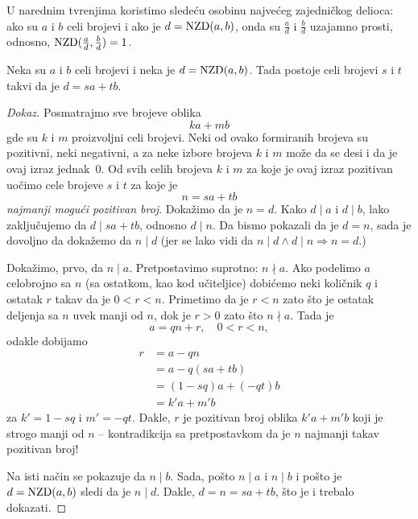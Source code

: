 U narednim tvr\dj enjima koristimo slede\'cu osobinu najve\'ceg zajedni\v ckog delioca:
ako su $a$ i $b$ celi brojevi i ako je $d = \mathrm{NZD}(a, b)$, onda su $\frac ad$ i $\frac bd$
uzajamno prosti, odnosno, $\mathrm{NZD}(\frac ad, \frac bd) = 1$.

\begin{EX}\label{ft05.ex.NZD-lin-komb}
  Neka su $a$ i $b$ celi brojevi i neka je $d = \mathrm{NZD}(a, b)$. Tada postoje celi brojevi $s$ i $t$ takvi da je
  $d = s a + t b$.
\end{EX}
\begin{proof}[Dokaz]
  Posmatrajmo sve brojeve oblika
  $$
    k a + m b
  $$
  gde su $k$ i $m$ proizvoljni celi brojevi. Neki od ovako formiranih brojeva su pozitivni, neki negativni, a za neke
  izbore brojeva $k$ i $m$ mo\v ze da se desi i da je ovaj izraz jednak~0. Od svih celih brojeva $k$ i $m$ za koje
  je ovaj izraz pozitivan uo\v cimo cele brojeve $s$ i $t$ za koje je
  $$
    n = s a + t b
  $$
  \emph{najmanji mogu\'ci pozitivan broj}. Doka\v zimo da je $n = d$. Kako $d \mid a$ i $d \mid b$, lako
  zaklju\v cujemo da $d \mid s a + t b$, odnosno $d \mid n$. Da bismo pokazali da je
  $d = n$, sada je dovoljno da doka\v zemo da $n \mid d$ (jer se lako vidi da
  $n \mid d \land d \mid n \Rightarrow n = d$.)
  
  Doka\v zimo, prvo, da $n \mid a$. Pretpostavimo suprotno: $n \nmid a$. Ako podelimo $a$ celobrojno sa $n$
  (sa ostatkom, kao kod u\v citeljice) dobi\'cemo neki koli\v cnik $q$ i ostatak $r$ takav da je $0 < r < n$.
  Primetimo da je $r < n$ zato \v sto je ostatak deljenja sa $n$ uvek manji od $n$, dok je
  $r > 0$ zato \v sto $n \nmid a$. Tada je
  $$
    a = q n + r, \quad 0 < r < n,
  $$
  odakle dobijamo
  \begin{align*}
    r &= a - q n\\
      &= a - q (s a + t b)\\
      &= (1 - s q) a + (-q t) b\\
      &= k' a + m' b
  \end{align*}
  za $k' = 1 - s q$ i $m' = -q t$. Dakle, $r$ je pozitivan broj oblika
  $k' a + m' b$ koji je strogo manji od $n$ -- kontradikcija sa pretpostavkom da je $n$
  najmanji takav pozitivan broj!
  
  Na isti na\v cin se pokazuje da $n \mid b$. Sada, po\v sto $n \mid a$ i $n \mid b$ i po\v sto je
  $d = \mathrm{NZD}(a, b)$ sledi da je $n \mid d$. Dakle, $d = n = s a + t b$, \v sto je i trebalo
  dokazati.
\end{proof}

